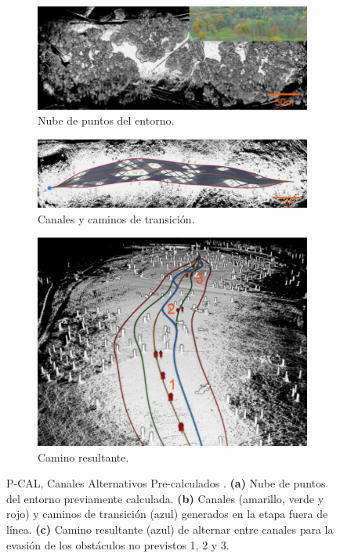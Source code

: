 \begin{figure}
    \centering
    \begin{subfigure}[b]{0.7\textwidth}
        \centering
        \includegraphics[width=\textwidth]{partes/img/P-CAL-map.png}
        \caption{Nube de puntos del entorno.}
    \end{subfigure}
    \hfill
    \begin{subfigure}[b]{0.7\textwidth}
        \centering
        \includegraphics[width=\textwidth]{partes/img/P-CAL-lanes.png}
        \caption{Canales y caminos de transición.}
    \end{subfigure}
    \break
    \begin{subfigure}[b]{0.5\textwidth}
        \centering
        \includegraphics[width=\textwidth]{partes/img/P-CAL-results.png}
        \caption{Camino resultante.}
    \end{subfigure}
    \hfill
    
    \caption [P-CAL: Canales Alternativos Pre-calculados]{P-CAL, Canales Alternativos Pre-calculados \cite{Zhang2019}. \textbf{(a)} Nube de puntos del entorno previamente calculada. \textbf{(b)} Canales (amarillo, verde y rojo) y caminos de transición (azul) generados en la etapa fuera de línea. \textbf{(c)} Camino resultante (azul) de alternar entre canales para la evasión de los obstáculos no previstos 1, 2 y 3.}
    \label{fig:P-CAL}
\end{figure}

